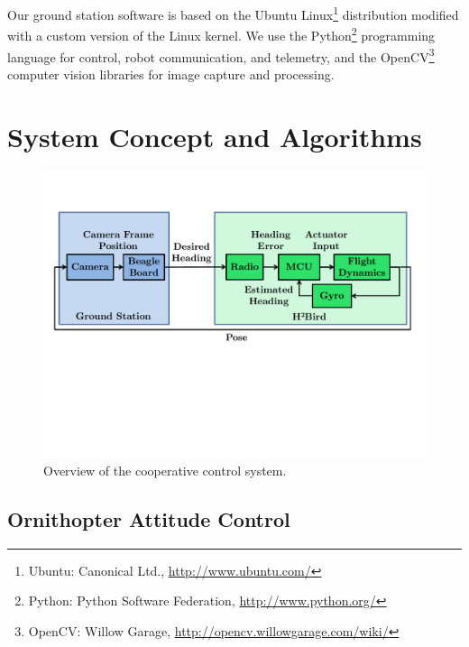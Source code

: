 \documentclass{aamas2013}
\begin{document}
Our ground station software is based on the Ubuntu Linux\footnote{\raggedright Ubuntu: 
Canonical Ltd., \href{http://www.ubuntu.com/}{http://www.ubuntu.com/}} distribution
modified with a custom version of the Linux kernel. 
We use the Python\footnote{\raggedright Python: Python Software Federation, \href{http://www.python.org/}
{http://www.python.org/}} programming language for control, robot 
communication, and telemetry, and the OpenCV\footnote{\raggedright OpenCV: Willow Garage, 
\href{http://opencv.willowgarage.com/wiki/}{http://opencv.willowgarage.com/wiki/}} 
computer vision libraries for image capture and processing.
\section{System Concept and Algorithms}

\begin{figure}[tb]
\centering
\includegraphics[width=\linewidth]{figures/process_flow.pdf}
\caption{Overview of the cooperative control system.}
\label{fig:process_flow}
\end{figure}

\subsection{Ornithopter Attitude Control}
\end{document}

